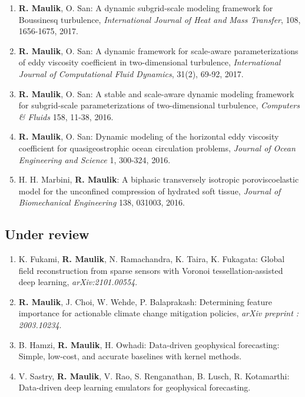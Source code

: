 \documentclass[letterpaper]{article}
\begin{document}
\begin{enumerate}
\item \textbf{R. Maulik}, O. San: A dynamic subgrid-scale modeling framework for Boussinesq turbulence, {\it International Journal of Heat and Mass Transfer}, 108, 1656-1675, 2017. 

\item \textbf{R. Maulik}, O. San: A dynamic framework for scale-aware parameterizations of eddy viscosity coefficient in two-dimensional turbulence, {\it International Journal of Computational Fluid Dynamics}, 31(2), 69-92, 2017. 

\item \textbf{R. Maulik}, O. San: A stable and scale-aware dynamic modeling framework for subgrid-scale parameterizations of two-dimensional turbulence, {\it Computers \& Fluids} 158, 11-38, 2016. 

\item \textbf{R. Maulik}, O. San: Dynamic modeling of the horizontal eddy viscosity coefficient for quasigeostrophic ocean circulation problems, {\it Journal of Ocean Engineering and Science} 1, 300-324, 2016.

\item H. H. Marbini, \textbf{R. Maulik}: A biphasic transversely isotropic poroviscoelastic model for the unconfined compression of hydrated soft tissue, {\it Journal of Biomechanical Engineering} 138, 031003, 2016.

\end{enumerate}

\subsection*{Under review}

\begin{enumerate}

\item K. Fukami, \textbf{R. Maulik}, N. Ramachandra, K. Taira, K. Fukagata: Global field reconstruction from sparse sensors with Voronoi tessellation-assisted deep learning, {\it arXiv:2101.00554}.

\item \textbf{R. Maulik}, J. Choi,  W. Wehde, P. Balaprakash: Determining feature importance for actionable climate change mitigation policies, {\it arXiv preprint : 2003.10234}.

\item B. Hamzi, \textbf{R. Maulik}, H. Owhadi: Data-driven geophysical forecasting: Simple, low-cost, and accurate baselines with kernel methods.

\item V. Sastry, \textbf{R. Maulik}, V. Rao, S. Renganathan, B. Lusch, R. Kotamarthi: Data-driven deep learning emulators for geophysical forecasting.

\end{enumerate}
\end{document}
